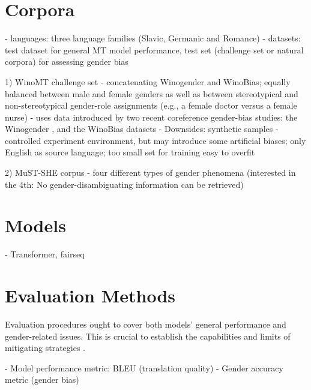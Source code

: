 \section{Corpora}
\label{sec:Experiments:Corpora}
- languages: three language families (Slavic, Germanic and Romance)
- datasets: test dataset for general MT model performance, test set (challenge set or natural corpora) for assessing gender bias


1) WinoMT challenge set
- concatenating Winogender and WinoBias; equally balanced between male and female genders as well as between stereotypical and non-stereotypical gender-role assignments (e.g., a female doctor versus a female nurse)
- uses data introduced by two recent coreference gender-bias studies: the
Winogender \parencite{Rudinger_2018_coreference}, and the WinoBias \cite{Zhao_2018_coreference} datasets
- Downsides: synthetic samples - controlled experiment environment, but may introduce some artificial biases; only English as source language; too small set for training easy to overfit

2) MuST-SHE corpus
- four different types of gender phenomena (interested in the 4th: No gender-disambiguating information can be retrieved)

\section{Models}
\label{sec:Experiments:Models}
- Transformer, fairseq

\section{Evaluation Methods}
\label{sec:Experiments:Evaluation}

Evaluation procedures ought to cover both models’ general performance and gender-related issues. This is crucial to establish the capabilities and limits of mitigating strategies \cite{Savoldi_2021}.

- Model performance metric: BLEU (translation quality)
- Gender accuracy metric (gender bias)


